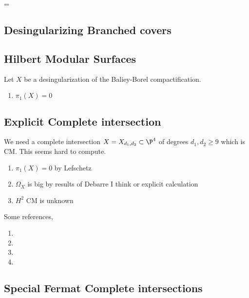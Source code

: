 =\documentclass[12pt]{article}
\begin{document}
\subsection{Desingularizing Branched covers}

\subsection{Hilbert Modular Surfaces}

Let $X$ be a desingularization of the Baliey-Borel compactification.

\begin{enumerate}
\item $\pi_1(X) = 0$ 
\end{enumerate}

\subsection{Explicit Complete intersection}

We need a complete intersection $X = X_{d_1, d_2} \subset \P^4$ of degrees $d_1, d_2 \ge 9$ which is CM. This seems hard to compute.

\begin{enumerate}
\item $\pi_1(X) = 0$ by Lefschetz
\item $\Omega_X$ is big by results of Debarre I think or explicit calculation
\item $H^2$ CM is unknown
\end{enumerate}

Some references,
\begin{enumerate}
\item {}

\item {}

\item {}

\item {}
\end{enumerate}

\subsection{Special Fermat Complete intersections}
\end{document}
